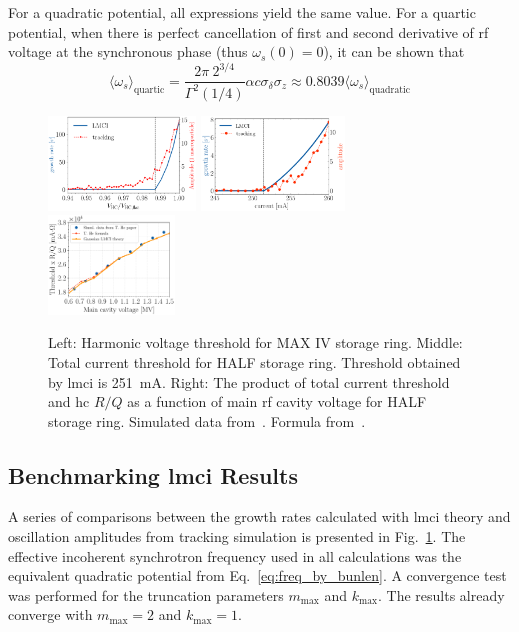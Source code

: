 \documentclass[a4paper,
               ]{jacow}
\begin{document}
For a quadratic potential, all expressions yield the same value. For a quartic potential, when there is perfect cancellation of first and second derivative of rf voltage at the synchronous phase (thus $\omega_s(0) = 0$), it can be shown that~\cite{Venturini2018, Lindberg2018}
\begin{equation}
    \langle \omega_s \rangle_\mathrm{quartic} = \frac{2\pi~2^{3/4}}{\Gamma^2(1/4)} \alpha c \sigma_\delta\sigma_z \approx 0.8039 \langle\omega_s\rangle_\mathrm{quadratic}
\end{equation}

\begin{figure}
    \centering
    \includegraphics[width=0.35\textwidth]{MOPS32_f3a.png}
    \includegraphics[width=0.34\textwidth]{MOPS32_f3b.png}
    \includegraphics[width=0.30\textwidth]{MOPS32_f3c.pdf}
    \caption{Left: Harmonic voltage threshold for MAX IV storage ring. Middle: Total current threshold for HALF storage ring. Threshold obtained by \gls{lmci} is \SI{251}{\milli\ampere}. Right: The product of total current threshold and \gls{hc} $R/Q$ as a function of main rf cavity voltage for HALF storage ring. Simulated data from~\cite{He2022a}. Formula from~\cite{He2022b}.}
    \label{fig:benchmark}
\end{figure}
\subsection{Benchmarking \gls{lmci} Results}
A series of comparisons between the growth rates calculated with \gls{lmci} theory and oscillation amplitudes from tracking simulation is presented in Fig.~\ref{fig:benchmark}. The effective incoherent synchrotron frequency used in all calculations was the equivalent quadratic potential from Eq.~\eqref{eq:freq_by_bunlen}. A convergence test was performed for the truncation parameters $m_\mathrm{max}$ and $k_\mathrm{max}$. The results already converge with $m_\mathrm{max}=2$ and $k_\mathrm{max}=1$.
\end{document}
